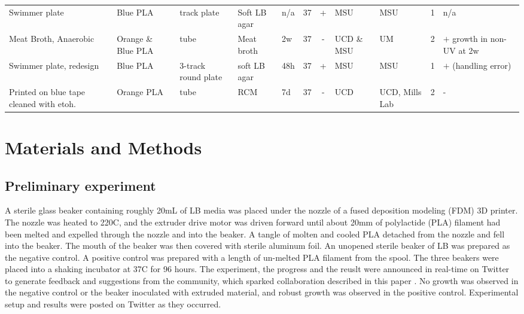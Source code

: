 \begin{refsection}
\begin{table}
\begin{tabular}{@{}p{8em}p{7em}p{3em}p{2em}p{2em}p{1em}cp{2em}p{2em}p{3em}p{8em}@{}}
Swimmer plate \cite{tweet_swimming_tracks_1} & Blue PLA & track plate & Soft LB agar & n/a & 37 & + & MSU & MSU & 1 & n/a \\
Meat Broth, Anaerobic \cite{tweet_meat_broth_result} & Orange \& Blue PLA & tube & Meat broth & 2w & 37 & - & UCD \& MSU & UM & 2 & $+$ growth in non-UV at 2w \\
Swimmer plate, redesign \cite{tweet_swimming_tracks_2} & Blue PLA & 3-track round plate & soft LB agar & 48h & 37 & + & MSU & MSU & 1 & $+$ (handling error) \\
Printed on blue tape cleaned with etoh.\cite{zactlewis2014} & Orange PLA & tube & RCM & 7d & 37 & - & UCD & UCD, Mills Lab & 2 & -
\end{tabular}

\end{table}

\section{Materials and Methods}

\subsection{Preliminary experiment}

A sterile glass beaker containing roughly 20mL of LB media was placed
under the nozzle of a fused deposition modeling (FDM) 3D printer. The
nozzle was heated to 220C, and the extruder drive motor was driven
forward until about 20mm of polylactide (PLA) filament had been melted
and expelled through the nozzle and into the beaker. A tangle of
molten and cooled PLA detached from the nozzle and fell into the
beaker. The mouth of the beaker was then covered with sterile aluminum
foil. An unopened sterile beaker of LB was prepared as the negative
control. A positive control was prepared with a length of un-melted
PLA filament from the spool. The three beakers were placed into a
shaking incubator at 37C for 96 hours. The experiment, the progress
and the reuslt were announced in real-time on Twitter to generate
feedback and suggestions from the community, which sparked
collaboration described in this paper \cite{tweet_conjecture,
  tweet_first_result_1, tweet_first_result_2, tweet_2nd_test,
  tweet_2nd_result}. No growth was observed in the negative control or
the beaker inoculated with extruded material, and robust growth was
observed in the positive control. Experimental setup and results were
posted on Twitter as they occurred.


\end{refsection}
